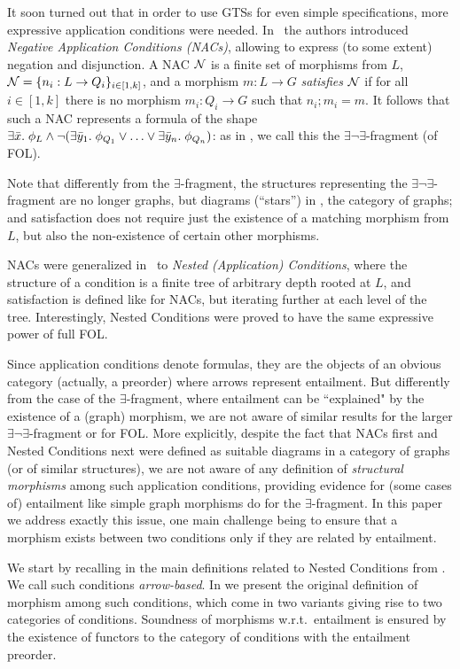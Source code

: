 It soon turned out that in order to use GTSs for even simple specifications, more expressive application conditions were needed. 
In~\cite{NegativeAC} the authors introduced \emph{Negative Application Conditions (NACs)}, allowing to express (to some extent) negation and disjunction.  A NAC $\mathcal{N}$ is  a finite set of morphisms from $L$, $\mathcal{N} = \{n_i: L \rightarrow Q_i\}_{i\in[1,k]}$, and a morphism $m: L \to G$ \emph{satisfies} $\mathcal{N}$ if for all $i\in[1,k]$ there is no morphism $m_i: Q_i \to G$ such that $n_i;m_i = m$. 
It follows that such a NAC represents a formula of the shape $\exists \bar{x}.\; \phi_L \wedge \neg (\exists \bar{y}_1.\; \phi_{Q_1} \vee \ldots \vee \exists \bar{y}_n.\; \phi_{Q_n})$: as in \cite{Rensink-FOL}, we call this the $\exists \neg \exists$-fragment (of FOL).

Note that differently from the $\exists$-fragment, the structures representing the $\exists \neg \exists$-fragment are no longer graphs, but diagrams (``stars'') in , the category of graphs; and satisfaction does not require just the existence of a matching morphism from $L$, but also the non-existence of certain other morphisms.

NACs were generalized in~\cite{Rensink-FOL,Habel-FOL} to \emph{Nested (Application) Conditions}, where the structure of a condition is a finite tree of arbitrary depth rooted at $L$, and satisfaction is defined like for NACs, but iterating further at each level of the tree. Interestingly, Nested Conditions were proved to have the same expressive power of full FOL.

Since application conditions denote formulas, they are the objects of an obvious category (actually, a preorder) where arrows represent entailment. But differently from the case of the $\exists$-fragment, where entailment can be ``explained" by the existence of a (graph) morphism, we are not aware of similar results for the larger $\exists \neg\exists$-fragment or for FOL. More explicitly, despite the fact that NACs first and Nested Conditions next were defined as suitable diagrams in a category of graphs (or of similar structures), we are not aware of any definition of \emph{structural morphisms} among such application conditions, providing evidence for (some cases of) entailment like simple graph morphisms do for the $\exists$-fragment. In this paper we address exactly this issue, one main challenge being to ensure that a morphism exists between two conditions only if they are related by entailment.

We start by recalling in  the main definitions related to Nested Conditions from \cite{Rensink-FOL}. We call such conditions \emph{arrow-based}.
In  we present the original definition of morphism among such conditions, which come in two variants giving rise to two categories of conditions. Soundness of morphisms w.r.t.~entailment is ensured by the existence of functors to the category of conditions with the entailment preorder.

